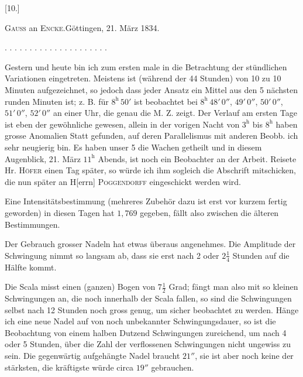 \clearpage\begingroup{}
\begin{center}[10.]\end{center}
\begin{center}\textsc{Gauss} an \textsc{Encke}.\quad Göttingen, 21. März 1834.\end{center}
\noindent . . . . . . . . . . . . . . . . . . . . .\par
\indent Gestern und heute bin ich zum ersten male in die Betrachtung der stündlichen
Variationen eingetreten. Meistens ist (während der 44 Stunden) von
10 zu 10 Minuten aufgezeichnet, so jedoch dass jeder Ansatz ein Mittel aus
den 5 nächsten runden Minuten ist; z. B. für \(8^{\mathrm{h}}\,50'\) ist beobachtet bei
\(8^{\mathrm{h}}\,48'\,0''\), \(49'\,0''\), \(50'\,0''\), \(51'\,0''\), \(52'\,0''\) an einer Uhr, die genau die M. Z. zeigt.
Der Verlauf am ersten Tage ist eben der gewöhnliche gewesen, allein in der
vorigen Nacht von \(3^{\mathrm{h}}\) bis \(8^{\mathrm{h}}\) haben grosse Anomalien Statt gefunden, auf deren
Parallelismus mit anderen Beobb. ich sehr neugierig bin. Es haben unser 5
die Wachen getheilt und in diesem Augenblick, 21. März \(11^{\mathrm{h}}\) Abends, ist noch
ein Beobachter an der Arbeit. Reisete Hr. \textsc{Höfer} einen Tag später, so würde
ich ihm sogleich die Abschrift mitschicken, die nun später an H[errn] \textsc{Poggendorff}
eingeschickt werden wird.

Eine  Intensitätsbestimmung (mehreres Zubehör dazu ist erst
vor kurzem fertig geworden) in diesen Tagen hat \(1{,}769\) gegeben, fällt also
zwischen die älteren Bestimmungen.

Der Gebrauch grosser Nadeln hat etwas überaus angenehmes. Die Amplitude
der Schwingung nimmt so langsam ab, dass sie erst nach 2 oder \(2\frac{1}{4}\)
Stunden auf die Hälfte kommt.

Die Scala misst einen (ganzen) Bogen von \(7\frac{1}{2}\) Grad; fängt man also mit
so kleinen Schwingungen an, die noch innerhalb der Scala fallen, so sind
die Schwingungen selbst nach 12 Stunden noch gross genug, um sicher beobachtet
zu werden. Hänge ich eine neue Nadel auf von noch unbekannter
Schwingungsdauer, so ist die Beobachtung von einem halben Dutzend Schwingungen
zureichend, um nach 4 oder 5 Stunden, über die Zahl der verflossenen
Schwingungen nicht ungewiss zu sein. Die gegenwärtig aufgehängte Nadel
braucht \(21''\), sie ist aber noch keine der stärksten, die kräftigste würde circa
\(19''\) gebrauchen.

